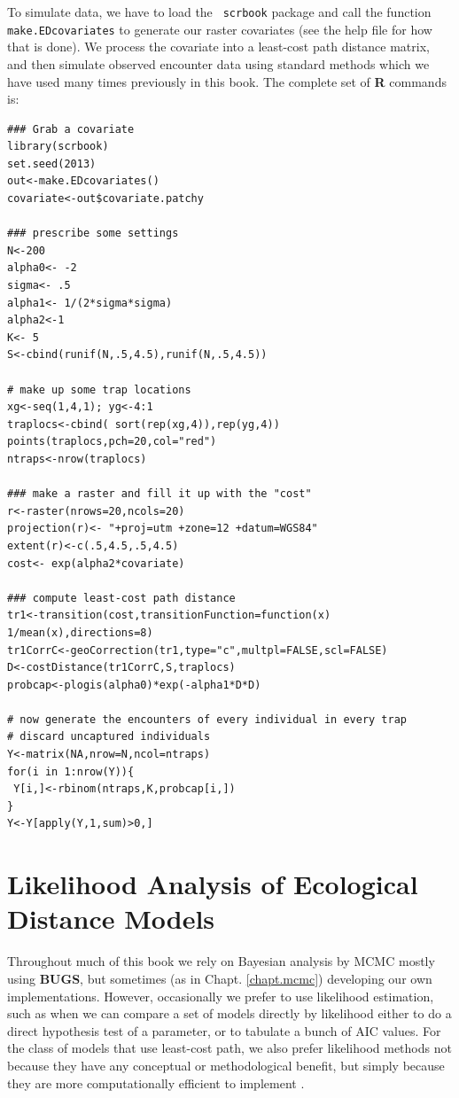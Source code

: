 To simulate data,
 we have to load the \mbox{\tt
scrbook} package and call the function \mbox{\tt make.EDcovariates} to generate
our raster covariates (see the help file for how that is done). We
process the covariate into a least-cost path distance
matrix, and then simulate observed encounter data using standard methods
which we have used many times previously in this book. The complete set
of {\bf R} commands is:
{\small
\begin{verbatim}
### Grab a covariate
library(scrbook)
set.seed(2013)
out<-make.EDcovariates()
covariate<-out$covariate.patchy

### prescribe some settings
N<-200
alpha0<- -2
sigma<- .5
alpha1<- 1/(2*sigma*sigma)
alpha2<-1
K<- 5
S<-cbind(runif(N,.5,4.5),runif(N,.5,4.5))

# make up some trap locations
xg<-seq(1,4,1); yg<-4:1
traplocs<-cbind( sort(rep(xg,4)),rep(yg,4))
points(traplocs,pch=20,col="red")
ntraps<-nrow(traplocs)

### make a raster and fill it up with the "cost"
r<-raster(nrows=20,ncols=20)
projection(r)<- "+proj=utm +zone=12 +datum=WGS84"
extent(r)<-c(.5,4.5,.5,4.5)
cost<- exp(alpha2*covariate)

### compute least-cost path distance
tr1<-transition(cost,transitionFunction=function(x) 1/mean(x),directions=8)
tr1CorrC<-geoCorrection(tr1,type="c",multpl=FALSE,scl=FALSE)
D<-costDistance(tr1CorrC,S,traplocs)
probcap<-plogis(alpha0)*exp(-alpha1*D*D)

# now generate the encounters of every individual in every trap
# discard uncaptured individuals
Y<-matrix(NA,nrow=N,ncol=ntraps)
for(i in 1:nrow(Y)){
 Y[i,]<-rbinom(ntraps,K,probcap[i,])
}
Y<-Y[apply(Y,1,sum)>0,]
\end{verbatim}
}


\section{Likelihood Analysis of Ecological Distance Models}
\label{ecoldist.sec.mle}

Throughout much of this book we rely on Bayesian analysis by MCMC
mostly using {\bf BUGS}, but sometimes (as in Chapt. \ref{chapt.mcmc})
developing our own implementations. However, occasionally we prefer to
use likelihood estimation, such as when we can compare a set of models
directly by likelihood either to do a direct hypothesis test of a
parameter, or to tabulate a bunch of AIC values. For the class of
models that use least-cost path, we also prefer likelihood methods not
because they have any conceptual or methodological benefit, but simply
because they are more computationally efficient to implement
\citep{royle_etal:2012ecol}.

